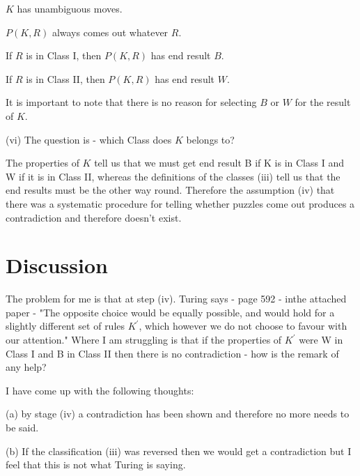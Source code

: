 \documentclass{article}[12pt]
\begin{document}
\noindent

$K$ has unambiguous moves.

\noindent

$P(K,R)$ always comes out whatever $R$.  

\noindent

If $R$ is in Class I, then $P(K,R)$ has end result $B$. 

\noindent

If $R$ is in Class II, then $P(K,R)$ has end result $W$.

\noindent

It is important to note that there is no reason for selecting $B$ or $W$ for the result of $K$. 

\noindent

(vi)  The question is - which Class does $K$ belongs to? 

\noindent

The properties of $K$ tell us that we must get end result B if K is in Class I and W if it is in Class II, whereas the definitions of the classes (iii) tell us that the end results must be the other way round.  Therefore the assumption (iv) that there was a systematic procedure for telling whether puzzles come out produces a contradiction and therefore doesn't exist.

\section*{Discussion}

\noindent

The problem for me is that at step (iv).  Turing says - page 592 - inthe attached paper - "The opposite choice would be equally possible, and would hold for a slightly different set of rules $K^\prime$, which however we do not choose to favour with our attention." Where I am struggling is that if the properties of  $K^\prime$ were W in Class I and B in Class II then there is no contradiction - how is the remark of any help?
\noindent

I have come up with the following thoughts:

\noindent

(a) by stage (iv) a contradiction has been shown and therefore no more needs to be said.

\noindent

(b) If the classification (iii) was reversed then we would get a contradiction but I feel that this is not what Turing is saying.

\noindent
\end{document}
